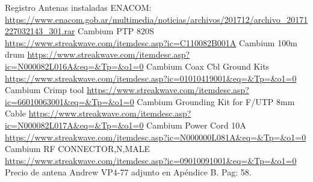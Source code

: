 \begin{thebibliography}{99}
 Registro Antenas instaladas ENACOM: \url{https://www.enacom.gob.ar/multimedia/noticias/archivos/201712/archivo_20171227032143_301.rar}
Cambium PTP 820S \url{https://www.streakwave.com/itemdesc.asp?ic=C110082B001A}
Cambium 100m drum \url{https://www.streakwave.com/itemdesc.asp?ic=N000082L016A&eq=&Tp=&o1=0}
Cambium Coax Cbl Ground Kits \url{https://www.streakwave.com/itemdesc.asp?ic=01010419001&eq=&Tp=&o1=0}
Cambium Crimp tool \url{https://www.streakwave.com/itemdesc.asp?ic=66010063001&eq=&Tp=&o1=0}
Cambium Grounding Kit for F/UTP 8mm Cable \url{https://www.streakwave.com/itemdesc.asp?ic=N000082L017A&eq=&Tp=&o1=0}
Cambium Power Cord 10A \url{https://www.streakwave.com/itemdesc.asp?ic=N000000L081A&eq=&Tp=&o1=0}
Cambium RF CONNECTOR,N,MALE \url{https://www.streakwave.com/itemdesc.asp?ic=09010091001&eq=&Tp=&o1=0}
Precio de antena Andrew VP4-77 adjunto en Apéndice B. Pag: 58. 
\end{thebibliography}

\newpage